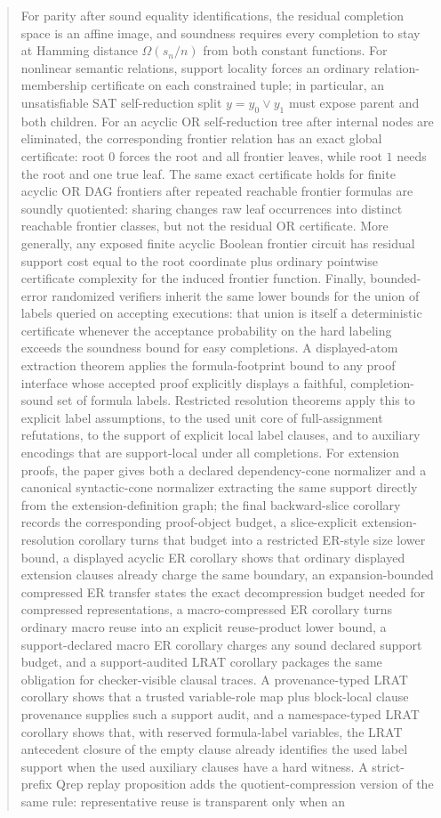 \documentclass[11pt]{article}
\theoremstyle{definition}
\begin{document}
\begin{abstract}
For parity after sound equality identifications, the residual completion space is an affine image, and soundness requires every completion to stay at Hamming distance $\Omega(s_n/n)$ from both constant functions.  For nonlinear semantic relations, support locality forces an ordinary relation-membership certificate on each constrained tuple; in particular, an unsatisfiable SAT self-reduction split \(y=y_0\vee y_1\) must expose parent and both children.  For an acyclic OR self-reduction tree after internal nodes are eliminated, the corresponding frontier relation has an exact global certificate: root \(0\) forces the root and all frontier leaves, while root \(1\) needs the root and one true leaf.  The same exact certificate holds for finite acyclic OR DAG frontiers after repeated reachable frontier formulas are soundly quotiented: sharing changes raw leaf occurrences into distinct reachable frontier classes, but not the residual OR certificate.  More generally, any exposed finite acyclic Boolean frontier circuit has residual support cost equal to the root coordinate plus ordinary pointwise certificate complexity for the induced frontier function.  Finally, bounded-error randomized verifiers inherit the same lower bounds for the union of labels queried on accepting executions: that union is itself a deterministic certificate whenever the acceptance probability on the hard labeling exceeds the soundness bound for easy completions.  A displayed-atom extraction theorem applies the formula-footprint bound to any proof interface whose accepted proof explicitly displays a faithful, completion-sound set of formula labels.  Restricted resolution theorems apply this to explicit label assumptions, to the used unit core of full-assignment refutations, to the support of explicit local label clauses, and to auxiliary encodings that are support-local under all completions.  For extension proofs, the paper gives both a declared dependency-cone normalizer and a canonical syntactic-cone normalizer extracting the same support directly from the extension-definition graph; the final backward-slice corollary records the corresponding proof-object budget, a slice-explicit extension-resolution corollary turns that budget into a restricted ER-style size lower bound, a displayed acyclic ER corollary shows that ordinary displayed extension clauses already charge the same boundary, an expansion-bounded compressed ER transfer states the exact decompression budget needed for compressed representations, a macro-compressed ER corollary turns ordinary macro reuse into an explicit reuse-product lower bound, a support-declared macro ER corollary charges any sound declared support budget, and a support-audited LRAT corollary packages the same obligation for checker-visible clausal traces.  A provenance-typed LRAT corollary shows that a trusted variable-role map plus block-local clause provenance supplies such a support audit, and a namespace-typed LRAT corollary shows that, with reserved formula-label variables, the LRAT antecedent closure of the empty clause already identifies the used label support when the used auxiliary clauses have a hard witness.  A strict-prefix Qrep replay proposition adds the quotient-compression version of the same rule: representative reuse is transparent only when an 
\end{abstract}
\end{document}
